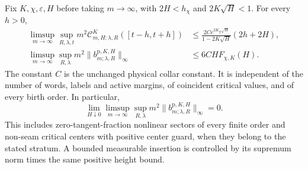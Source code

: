 \begin{theorem}
\label{thm:v68-all-order-height}
Fix $K,\chi,\varepsilon,H$ before taking $m\to\infty$, with
$2H<h_\chi$ and $2K\sqrt H<1$. For every $h>0$,
\begin{align}
 \limsup_{m\to\infty}\sup_{R,\lambda,t}
 m^2\mathcal C^K_{m,H;\lambda,R}([t-h,t+h])
 &\le\frac{2Ce^{2K_\chi\sqrt H}}{1-2K\sqrt H}(2h+2H),
                                               \label{eq:v68-scale-concentration}\\
 \limsup_{m\to\infty}\sup_{R,\lambda}
 m^2\|b^{\mathrm p,K,H}_{m;\lambda,R}\|_\infty
 &\le6CH F_{\chi,K}(H).                       \label{eq:v68-all-order-height}
\end{align}
The constant $C$ is the unchanged physical collar constant. It is
independent of the number of words, labels and active margins, of
coincident critical values, and of every birth order. In particular,
\begin{equation}\label{eq:v68-ordered-vanishing-height}
 \lim_{H\downarrow0}\limsup_{m\to\infty}\sup_{R,\lambda}
             m^2\|b^{\mathrm p,K,H}_{m;\lambda,R}\|_\infty=0.
\end{equation}
This includes zero-tangent-fraction nonlinear sectors of every finite
order and non-seam critical centers with positive center guard, when
they belong to the stated stratum. A bounded measurable insertion is
controlled by its supremum norm times the same positive height bound.
\end{theorem}
